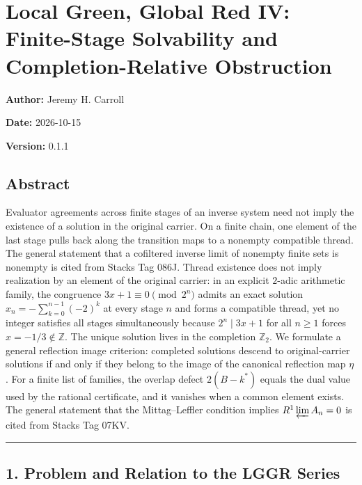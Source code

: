 \documentclass[
  11pt,
]{article}
\author{}
\date{2026-10-15}
\theoremstyle{plain}
\theoremstyle{definition}\newtheorem{definition}[theorem]{Definition}
\theoremstyle{remark}\newtheorem*{remark}{Remark}
\begin{document}
\section{Local Green, Global Red IV: Finite-Stage Solvability and
Completion-Relative
Obstruction}\label{local-green-global-red-iv-finite-stage-solvability-and-completion-relative-obstruction}

\textbf{Author:} Jeremy H. Carroll

\textbf{Date:} 2026-10-15

\textbf{Version:} 0.1.1

\subsection{Abstract}\label{abstract}

Evaluator agreements across finite stages of an inverse system need not
imply the existence of a solution in the original carrier. On a finite
chain, one element of the last stage pulls back along the transition
maps to a nonempty compatible thread. The general statement that a
cofiltered inverse limit of nonempty finite sets is nonempty is cited
from Stacks Tag 086J. Thread existence does not imply realization by an
element of the original carrier: in an explicit \(2\)-adic arithmetic
family, the congruence \(3x+1 \equiv 0 \pmod{2^n}\) admits an exact
solution \(x_n = -\sum_{k=0}^{n-1}(-2)^k\) at every stage \(n\) and
forms a compatible thread, yet no integer satisfies all stages
simultaneously because \(2^n \mid 3x+1\) for all \(n \ge 1\) forces
\(x = -1/3 \notin \mathbb{Z}\). The unique solution lives in the
completion \(\mathbb{Z}_2\). We formulate a general reflection image
criterion: completed solutions descend to original-carrier solutions if
and only if they belong to the image of the canonical reflection map
\(\eta\). For a finite list of families, the overlap defect \(2(B-k^*)\)
equals the dual value used by the rational certificate, and it vanishes
when a common element exists. The general statement that the
Mittag--Leffler condition implies \(R^1 \varprojlim A_n = 0\) is cited
from Stacks Tag 07KV.

\begin{center}\rule{0.5\linewidth}{0.5pt}\end{center}

\subsection{1. Problem and Relation to the LGGR
Series}\label{problem-and-relation-to-the-lggr-series}
\end{document}

